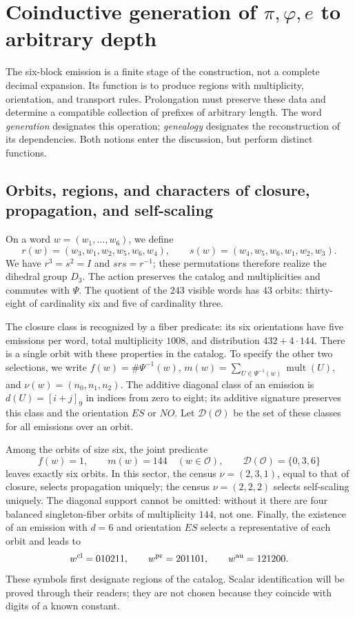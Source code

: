 \section{Coinductive generation of \texorpdfstring{\(\pi,\varphi,e\)}{pi, phi, e} to arbitrary depth}
\label{sec:generacion}

The six-block emission is a finite stage of the construction, not a complete decimal expansion. Its function is to produce regions with multiplicity, orientation, and transport rules. Prolongation must preserve these data and determine a compatible collection of prefixes of arbitrary length. The word \emph{generation} designates this operation; \emph{genealogy} designates the reconstruction of its dependencies. Both notions enter the discussion, but perform distinct functions.

\subsection{Orbits, regions, and characters of closure, propagation, and self-scaling}

On a word \(w=(w_1,\ldots,w_6)\), we define
\[
 r(w)=(w_3,w_1,w_2,w_5,w_6,w_4),\qquad
 s(w)=(w_4,w_5,w_6,w_1,w_2,w_3).
\]
We have \(r^3=s^2=I\) and \(srs=r^{-1}\); these permutations therefore realize the dihedral group \(D_3\). The action preserves the catalog and multiplicities and commutes with \(\Psi\). The quotient of the \(243\) visible words has \(43\) orbits: thirty-eight of cardinality six and five of cardinality three.

The closure class is recognized by a fiber predicate: its six orientations have five emissions per word, total multiplicity \(1008\), and distribution \(432+4\cdot144\). There is a single orbit with these properties in the catalog. To specify the other two selections, we write \(f(w)=\#\Psi^{-1}(w)\), \(m(w)=\sum_{U\in\Psi^{-1}(w)}\operatorname{mult}(U)\), and \(\nu(w)=(n_0,n_1,n_2)\). The additive diagonal class of an emission is \(d(U)=[i+j]_9\) in indices from zero to eight; its additive signature preserves this class and the orientation \(ES\) or \(NO\). Let \(\mathcal D(\mathcal O)\) be the set of these classes for all emissions over an orbit.

Among the orbits of size six, the joint predicate
\[
 f(w)=1,\qquad m(w)=144\quad(w\in\mathcal O),\qquad
 \mathcal D(\mathcal O)=\{0,3,6\}
\]
leaves exactly six orbits. In this sector, the census \(\nu=(2,3,1)\), equal to that of closure, selects propagation uniquely; the census \(\nu=(2,2,2)\) selects self-scaling uniquely. The diagonal support cannot be omitted: without it there are four balanced singleton-fiber orbits of multiplicity \(144\), not one. Finally, the existence of an emission with \(d=6\) and orientation \(ES\) selects a representative of each orbit and leads to
\begin{equation}
 w^{\rm cl}=010211,\qquad w^{\rm pr}=201101,\qquad w^{\rm au}=121200.
 \label{eq:palabras-regionales}
\end{equation}
These symbols first designate regions of the catalog. Scalar identification will be proved through their readers; they are not chosen because they coincide with digits of a known constant.


